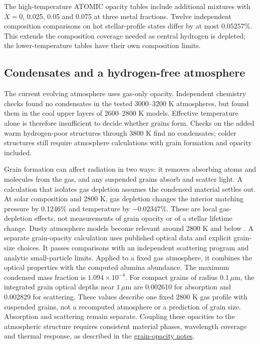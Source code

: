 \documentclass[11pt,letterpaper]{article}
\newcommand{\doc}[2]{\href{https://github.com/oklo/ember/blob/master/#1}{#2}}
\begin{document}
The high-temperature ATOMIC opacity tables include additional mixtures with
$X=0$, 0.025, 0.05 and 0.075 at three metal fractions. Twelve independent
composition comparisons on hot stellar-profile states differ by at most
$0.05257\%$. This extends the composition coverage needed as central hydrogen
is depleted; the lower-temperature tables have their own composition limits.

\subsection{Condensates and a hydrogen-free atmosphere}
The current evolving atmosphere uses gas-only opacity. Independent chemistry
checks found no condensates in the tested 3000--3200 K atmospheres, but found
them in the cool upper layers of 2600--2800 K models. Effective temperature
alone is therefore insufficient to decide whether grains form. Checks on the
added warm hydrogen-poor structures through 3800 K find no condensates;
colder structures still require atmosphere calculations with grain formation
and opacity included.

Grain formation can affect radiation in two ways: it removes absorbing atoms
and molecules from the gas, and any suspended grains absorb and scatter light.
A calculation that isolates gas depletion assumes the condensed material
settles out. At solar composition and 2800 K, gas depletion changes the
interior matching pressure by 0.1246\% and temperature by $-0.02347\%$.
These are local gas-depletion effects, not measurements of grain opacity or
of a stellar lifetime change. Dusty atmosphere models become relevant around
2800 K and below \cite{chabrier00}. A separate grain-opacity calculation uses published optical data and explicit
grain-size choices. It passes comparisons with an independent scattering program
and analytic small-particle limits. Applied to a fixed gas atmosphere, it
combines the optical properties with the computed alumina abundance. The maximum condensed mass fraction is
$1.094\times10^{-4}$. For compact grains of radius $0.1\,\mu\mathrm{m}$,
the integrated grain optical depths near $1\,\mu\mathrm{m}$ are 0.002610
for absorption and 0.002829 for scattering. These values describe one fixed
2800 K gas profile with suspended grains, not a recomputed atmosphere or a
prediction of grain size. Absorption and scattering remain separate. Coupling these opacities to the atmospheric structure requires consistent
material phases, wavelength coverage and thermal response, as described in the
\doc{docs/GRAINS.md}{grain-opacity notes}.
\end{document}
